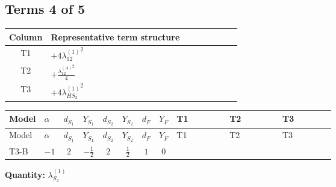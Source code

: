 \documentclass[8pt]{article}
\begin{document}
\begin{landscape}
\subsection*{Terms 4 of 5}
\begin{center}
\begin{tabular}{@{}c >{\raggedright\arraybackslash}p{0.82\linewidth}@{}}
\toprule
Column & Representative term structure \\
\midrule
T1 & \(\displaystyle +4 {\lambda_{12}^{(1)}}^2\) \\
\midrule
T2 & \(\displaystyle +\frac{{\lambda_{12}^{(A)}}^2}{4}\) \\
\midrule
T3 & \(\displaystyle +4 {\lambda_{HS_2}^{(1)}}^2\) \\
\midrule
\bottomrule
\end{tabular}
\end{center}
\smallskip
\tiny
\begin{longtable}{@{}llcccccc >{\raggedright\arraybackslash}p{0.21\linewidth} >{\raggedright\arraybackslash}p{0.21\linewidth} >{\raggedright\arraybackslash}p{0.21\linewidth}@{}}
\toprule
Model & $\alpha$ & $d_{S_1}$ & $Y_{S_1}$ & $d_{S_2}$ & $Y_{S_2}$ & $d_F$ & $Y_F$ & T1 & T2 & T3 \\
\midrule
\endfirsthead
\toprule
Model & $\alpha$ & $d_{S_1}$ & $Y_{S_1}$ & $d_{S_2}$ & $Y_{S_2}$ & $d_F$ & $Y_F$ & T1 & T2 & T3 \\
\midrule
\endhead
T3-B & $-1$ & $2$ & $-\frac{1}{2}$ & $2$ & $\frac{1}{2}$ & $1$ & $0$ & \scriptsize\adjustbox{max width=\linewidth}{$\begin{gathered} +4 {\lambda_{12}^{(1)}}^2\end{gathered}$} & \scriptsize\adjustbox{max width=\linewidth}{$\begin{gathered} +\frac{{\lambda_{12}^{(A)}}^2}{4}\end{gathered}$} & \scriptsize\adjustbox{max width=\linewidth}{$\begin{gathered} +4 {\lambda_{HS_2}^{(1)}}^2\end{gathered}$} \\
\midrule
\bottomrule
\end{longtable}
\clearpage
\noindent\textbf{Quantity: }$\lambda_{S_2}^{(1)}$\par\smallskip

\end{landscape}
\end{document}
